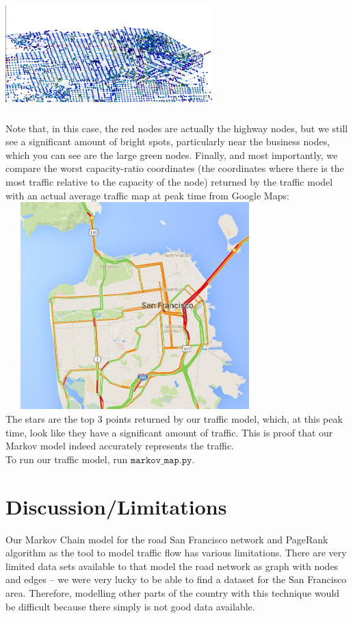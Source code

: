 \documentclass{article}
\begin{document}
 \includegraphics[width=8cm,height=5cm]{./figs/f3} \\
Note that, in this case, the red nodes are actually the highway nodes, but we still see a significant amount of bright spots, particularly near the business nodes, which you can see are the large green nodes.
Finally, and most importantly, we compare the worst capacity-ratio coordinates (the coordinates where there is the most traffic relative to the capacity of the node) returned by the traffic model with an actual average traffic map at peak time from Google Maps: \\
 \includegraphics[width=10cm,height=8cm]{./figs/fkey} \\
 The stars are the top 3 points returned by our traffic model, which, at this peak time, look like they have a significant amount of traffic. This is proof that our Markov model indeed accurately represents the traffic. \\
 To run our traffic model, run $\texttt{markov\_map.py}$.
\section{Discussion/Limitations}
Our Markov Chain model for the road San Francisco network and PageRank algorithm as the tool to model traffic flow has various limitations. There are very limited data sets available to that model the road network as graph with nodes and edges – we were very lucky to be able to find a dataset for the San Francisco area.  Therefore, modelling other parts of the country with this technique would be difficult because there simply is not good data available. 
\end{document}
